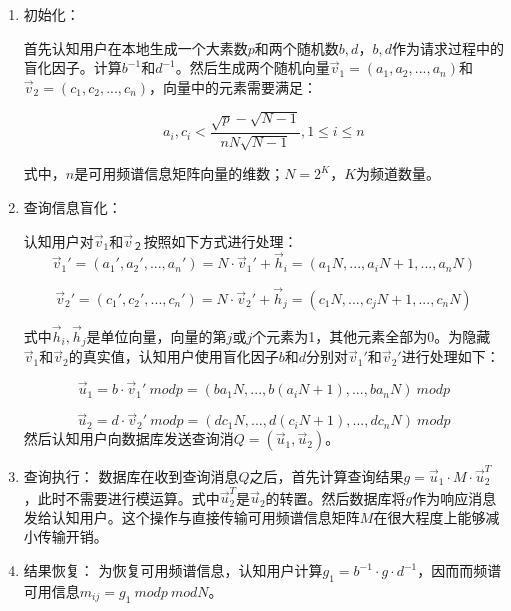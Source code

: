 \begin{enumerate}

\item 初始化：

首先认知用户在本地生成一个大素数$p$和两个随机数$b,d$，$b,d$作为请求过程中的盲化因子。计算$b^{-1}$和$d^{-1}$。然后生成两个随机向量$\vec v_{1} = (a_{1},a_{2},...,a_{n})$和$\vec v_{2} = (c_{1},c_{2},...,c_{n})$，向量中的元素需要满足：

\begin{displaymath}
a_{i},c_{i} < \frac{\sqrt{p}-\sqrt{N-1}}{nN\sqrt{N-1}},1 \leq i \leq n
\end{displaymath}

式中，$n$是可用频谱信息矩阵向量的维数；$N=2^{K}$，$K$为频道数量。

\item 查询信息盲化：

认知用户对$\vec v_{1}$和$\vec v_{２}$按照如下方式进行处理：
\begin{displaymath}
\vec v_{1}' = (a_{1}',a_{2}',...,a_{n}')=N \cdot \vec v_{1}' + \vec h_{i} = (a_{1}N,...,a_{i}N+1,...,a_{n}N)
\end{displaymath}

\begin{displaymath}
\vec v_{2}' = (c_{1}',c_{2}',...,c_{n}')=N \cdot \vec v_{2}' + \vec h_{j} = (c_{1}N,...,c_{j}N+1,...,c_{n}N)
\end{displaymath}

式中$\vec h_{i},\vec h_{j}$是单位向量，向量的第$j$或$j$个元素为1，其他元素全部为0。为隐藏$\vec v_{1}$和$\vec v_{2}$的真实值，认知用户使用盲化因子$b$和$d$分别对$\vec v_{1}'$和$\vec v_{2}'$进行处理如下：

\begin{displaymath}
\vec u_{1} = b \cdot \vec v_{1}' \ mod p = (ba_{1}N,...,b(a_{i}N+1),...,ba_{n}N) \ mod p
\end{displaymath}

\begin{displaymath}
\vec u_{2} = d \cdot \vec v_{2}' \ mod p = (dc_{1}N,...,d(c_{i}N+1),...,dc_{n}N) \ mod p
\end{displaymath}
然后认知用户向数据库发送查询消$Q=(\vec u_{1},\vec u_{2})$。

\item 查询执行：
数据库在收到查询消息$Q$之后，首先计算查询结果$g = \vec u_{1} \cdot M \cdot \vec u_{2}^{T}$，此时不需要进行模运算。式中$\vec u_{2}^{T}$是$\vec u_{2}$的转置。然后数据库将$g$作为响应消息发给认知用户。这个操作与直接传输可用频谱信息矩阵$M$在很大程度上能够减小传输开销。

\item 结果恢复：
为恢复可用频谱信息，认知用户计算$g_{1} = b^{-1} \cdot g \cdot d^{-1}$，因而而频谱可用信息$m_{ij}=g_{1} \ mod p \ mod N$。

\end{enumerate}
